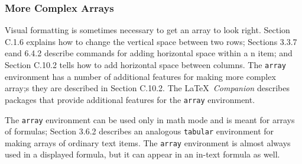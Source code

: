 \documentclass[twocolumn]{book}        %
\begin{document}
\subsubsection{More Complex Arrays}

Visual formatting is sometimes necessary to get an array to look right. Section C.1.6 explains 
how to change the vertical space between two rows; Sections 3.3.7 eand 6.4.2 describe commands for 
adding horizontal space within a n item; and Section C.10.2 tells how to add horizontal space 
between columns. The \texttt{array} environment has a number of additional features for making more 
complex array;s they are described in Section C.10.2. The \LaTeX\ \emph{Companion} describes packages 
that provide additional features for the \texttt{array} environment.

The \texttt{array} environment can be used only in math mode and is meant for arrays of formulas; 
Section 3.6.2 describes an analogous \texttt{tabular} environment for making arrays of ordinary text items. 
The \texttt{array} environment is almost always used in a displayed formula, but it can appear in an in-text 
formula as well.
\end{document}
